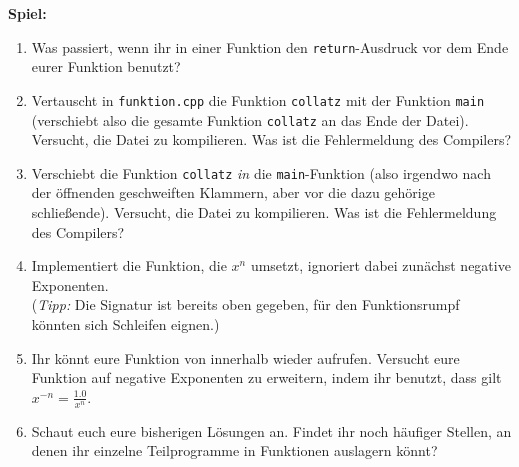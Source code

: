 \textbf{Spiel:}
\begin{enumerate}
    \item Was passiert, wenn ihr in einer Funktion den \texttt{return}-Ausdruck vor dem Ende eurer Funktion benutzt?
    \item Vertauscht in \texttt{funktion.cpp} die Funktion \texttt{collatz} mit der Funktion \texttt{main} (verschiebt also die gesamte Funktion \texttt{collatz} an das Ende der Datei).
        Versucht, die Datei zu kompilieren.
        Was ist die Fehlermeldung des Compilers?
    \item Verschiebt die Funktion \texttt{collatz} \emph{in} die \texttt{main}-Funktion (also irgendwo nach der öffnenden geschweiften Klammern, aber vor die dazu gehörige schließende).
        Versucht, die Datei zu kompilieren. Was ist die Fehlermeldung des Compilers?
    \item Implementiert die Funktion, die $x^n$ umsetzt, ignoriert dabei zunächst negative Exponenten. \\
        (\emph{Tipp:} Die Signatur ist bereits oben gegeben, für den Funktionsrumpf könnten sich Schleifen eignen.)
    \item Ihr könnt eure Funktion von innerhalb wieder aufrufen. Versucht eure Funktion auf negative Exponenten zu erweitern, indem ihr benutzt, dass gilt $x^{-n} = \frac{1.0}{x^n}$.
    \item Schaut euch eure bisherigen Lösungen an.
        Findet ihr noch häufiger Stellen, an denen ihr einzelne Teilprogramme in Funktionen auslagern könnt?
\end{enumerate}
